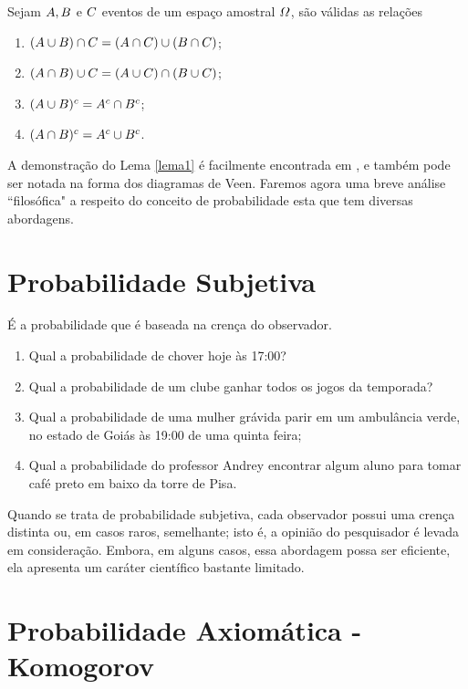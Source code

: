 \begin{lema}
\label{lema1} Sejam $\mathnormal{A,B}$ e $\mathnormal{C}$ eventos de um espaço amostral $\mathnormal{\Omega}$, são válidas as relações
    \begin{enumerate}
		\item[(i)] $(\mathnormal{A\cup B})\cap \mathnormal{C} = (\mathnormal{A\cap C})\cup (\mathnormal{B \cap C})$;
		\item[(ii)] $\mathnormal{(A\cap B)\cup C = (A\cup C)\cap (B \cup C)}$;
		\item[(iii)] $\mathnormal{(A \cup B)^c = A^c \cap B^c}$;
		\item[(iv)] $\mathnormal{(A \cap B)^c = A^c \cup B^c}$.
	\end{enumerate}
\end{lema}
\inic A demonstração do Lema \ref{lema1} é facilmente encontrada em \cite{magalhaes2006probabilidade}, e também pode ser notada na forma dos diagramas de Veen. Faremos agora uma breve análise ``filosófica" a respeito do conceito de probabilidade esta que tem diversas abordagens. 

\section{Probabilidade Subjetiva}
\inic É a probabilidade que é baseada na crença do observador.
	\begin{enumerate}
		\item[(i)] Qual a probabilidade de chover hoje às 17:00?
		\item[(ii)] Qual a probabilidade de um clube ganhar todos os jogos da temporada?
		\item[(iii)] Qual a probabilidade de uma mulher grávida parir em um ambulância verde, no estado de Goiás às 19:00 de uma quinta feira;
		\item[(iv)] Qual a probabilidade do professor Andrey encontrar algum aluno para tomar café preto em baixo da torre de Pisa.
	\end{enumerate}
    
   Quando se trata de probabilidade subjetiva, cada observador possui uma crença distinta ou, em casos raros, semelhante; isto é, a opinião do pesquisador é levada em consideração. Embora, em alguns casos, essa abordagem possa ser eficiente, ela apresenta um caráter científico bastante limitado.
 
\section{Probabilidade Axiomática - Komogorov}

